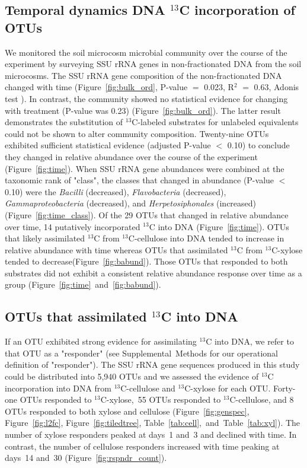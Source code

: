 \subsection{Temporal dynamics DNA $^{13}$C incorporation of OTUs}
We monitored the soil microcosm microbial community over the course of the
experiment by surveying SSU rRNA genes in non-fractionated DNA from the soil
microcosms. The SSU rRNA gene composition of the non-fractionated DNA changed
with time (Figure~\ref{fig:bulk_ord}, P-value $=$ 0.023, R$^{2}$ $=$ 0.63,
Adonis test \citep{Anderson2001a}). In contrast, the community showed no
statistical evidence for changing with treatment (P-value was 0.23)
(Figure~\ref{fig:bulk_ord}). The latter result demonstrates the substitution of
$^{13}$C-labeled substrates for unlabeled equivalents could not be shown to
alter community composition. Twenty-nine OTUs exhibited sufficient statistical
evidence (adjusted P-value $<$ 0.10) to conclude they changed in relative
abundance over the course of the experiment (Figure~\ref{fig:time}). When
SSU rRNA gene abundances were combined at the taxonomic rank of "class", the
classes that changed in abundance (P-value $<$ 0.10) were the \textit{Bacilli}
(decreased), \textit{Flavobacteria} (decreased), \textit{Gammaproteobacteria}
(decreased), and \textit{Herpetosiphonales} (increased)
(Figure~\ref{fig:time_class}). Of the 29 OTUs that changed in relative
abundance over time, 14 putatively incorporated $^{13}$C into DNA
(Figure~\ref{fig:time}). OTUs that likely assimilated $^{13}$C from
$^{13}$C-cellulose into DNA tended to increase in relative abundance with time
whereas OTUs that assimilated $^{13}$C from $^{13}$C-xylose tended to
decrease(Figure~\ref{fig:babund}). Those OTUs that responded to both substrates did not
exhibit a consistent relative abundance response over time as a group
(Figure~\ref{fig:time}~and~\ref{fig:babund}).

\subsection{OTUs that assimilated $^{13}$C into DNA} \label{responders}
If an OTU exhibited strong evidence for assimilating $^{13}$C into DNA, we
refer to that OTU as a "responder" (see Supplemental Methods for our
operational definition of "responder"). The SSU rRNA gene sequences produced in
this study could be distributed into 5,940 OTUs and we assessed the evidence of
$^{13}$C incorporation into DNA from $^{13}$C-cellulose and $^{13}$C-xylose for
each OTU. Forty-one OTUs responded to $^{13}$C-xylose,~55 OTUs responded to
$^{13}$C-cellulose, and 8 OTUs responded to both xylose and cellulose
(Figure~\ref{fig:genspec}, Figure~\ref{fig:l2fc}, Figure~\ref{fig:tiledtree},
Table~\ref{tab:cell},~and~Table~\ref{tab:xyl}). The number of xylose responders
peaked at days~1 and~3 and declined with time. In contrast, the number of
cellulose responders increased with time peaking at days~14 and~30
(Figure~\ref{fig:rspndr_count}). 

